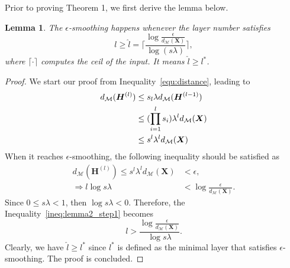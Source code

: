 \documentclass{article}
\newtheorem{lemma}[theorem]{Lemma}
\def\mH{{\bm{H}}}
\def\mX{{\bm{X}}}
\begin{document}
Prior to proving Theorem 1, we first derive the lemma below.
\begin{lemma}
\label{lemma:mixing_time}
The $\epsilon$-smoothing happens whenever the layer number satisfies
\begin{equation}
\label{Eq:l}
l \geq \hat{l}=\lceil\frac{\log \frac{\epsilon}{d_{\mathcal{M}}(\mX)}}{\log (s\lambda)}\rceil,
\end{equation}
where $\lceil\cdot\rceil$ computes the ceil of the input. It means $\hat{l}\geq l^{\ast}$.
\end{lemma}



\begin{proof}
We start our proof from Inequality~\ref{equ:distance}, leading to
\begin{align}
    \notag d_{\mathcal{M}}(\mH^{(l)})&\le s_l\lambda d_{\mathcal{M}}(\mH^{(l-1)})\\
    \notag &\le (\prod_{i=1}^{l}s_i)\lambda^l d_{\mathcal{M}}(\mX)\\
    \notag &\le s^l\lambda^l d_{\mathcal{M}}(\mX)
\end{align}
When it reaches $\epsilon$-smoothing, the following inequality should be satisfied as
\begin{align}
    d_\mathcal{M}(\mH^{(l)}) \le s^{l}\lambda^l d_{\mathcal{M}}(\mX) &< \epsilon, \nonumber\\
    \Rightarrow l\log s\lambda &< \log \frac{\epsilon}{d_{\mathcal{M}}(\mX)}\label{ineq:lemma2_step1}.
\end{align}
Since $0 \le s\lambda < 1$, then $\log s\lambda < 0$. Therefore, the Inequality~\ref{ineq:lemma2_step1} becomes
\begin{equation}
\label{Eq:lambda}
    l > \frac{\log \frac{\epsilon}{d_{\mathcal{M}}(\mX)}}{\log s\lambda}.
\end{equation}
Clearly, we have $\hat{l}\geq l^\ast$ since $l^*$ is defined as the minimal layer that satisfies $\epsilon$-smoothing.
The proof is concluded.
\end{proof}
\end{document}
